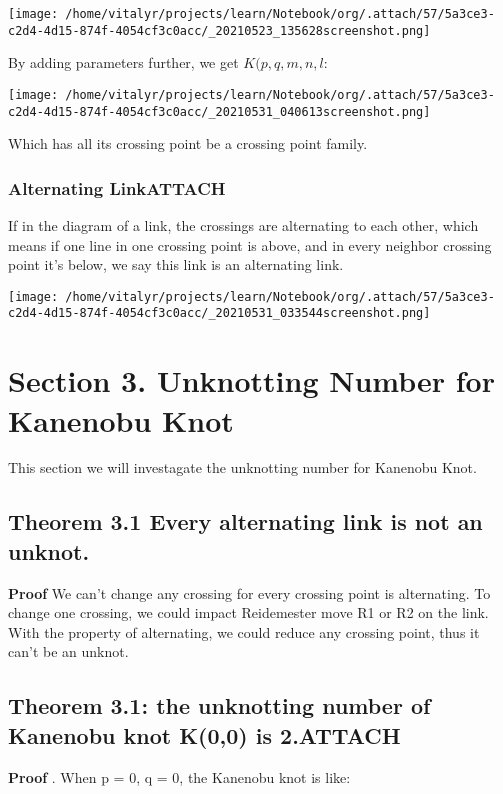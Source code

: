 \documentclass[a4paper]{article}
\begin{document}
\begin{center}
\texttt{[image: /home/vitalyr/projects/learn/Notebook/org/.attach/57/5a3ce3-c2d4-4d15-874f-4054cf3c0acc/\_20210523\_135628screenshot.png]}
\end{center}

By adding parameters further, we get \(K(p, q, m, n, l\):

\begin{center}
\texttt{[image: /home/vitalyr/projects/learn/Notebook/org/.attach/57/5a3ce3-c2d4-4d15-874f-4054cf3c0acc/\_20210531\_040613screenshot.png]}
\end{center}
Which has all its crossing point be a crossing point family.
\subsubsection{Alternating Link\hfill{}\textsc{ATTACH}}
\label{sec:org95d6b71}
If in the diagram of a link, the crossings are alternating to each other, which means if one line in one crossing point is above, and in every neighbor crossing point it's below, we say this link is an alternating link.

\begin{center}
\texttt{[image: /home/vitalyr/projects/learn/Notebook/org/.attach/57/5a3ce3-c2d4-4d15-874f-4054cf3c0acc/\_20210531\_033544screenshot.png]}
\end{center}

\section{Section 3. Unknotting Number for Kanenobu Knot}
\label{sec:org10387a8}
This section we will investagate the unknotting number for Kanenobu Knot.
\subsection{Theorem 3.1 Every alternating link is not an unknot.}
\label{sec:orga1ff992}
\textbf{Proof} We can't change any crossing for every crossing point is alternating. To change one crossing, we could impact Reidemester move R1 or R2 on the link. With the property of alternating, we could reduce any crossing point, thus it can't be an unknot.
\subsection{Theorem 3.1: the unknotting number of Kanenobu knot K(0,0) is 2.\hfill{}\textsc{ATTACH}}
\label{sec:org586677e}
\textbf{Proof} . When p = 0, q = 0, the Kanenobu knot is like:
\end{document}
